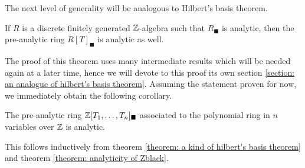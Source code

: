The next level of generality will be analogous to Hilbert's basis theorem.
\begin{theorem}
	\label{theorem: a kind of hilbert's basis theorem}
	
	If $R$ is a discrete finitely generated ${\mathbb{Z}}$-algebra such that $R_\blacksquare$ is analytic, then the pre-analytic ring $R[T]_\blacksquare$ is analytic as well.
\end{theorem}
The proof of this theorem uses many intermediate results which will be needed again at a later time, hence we will devote to this proof its own section \ref{section: an analogue of hilbert's basis theorem}. Assuming the statement proven for now, we immediately obtain the following corollary.
\begin{corollary}
	\label{corollary: analyticity of Ablack for finitely generated free Z-algebras}
	
	The pre-analytic ring ${\mathbb{Z}}[T_1,\dots, T_n]_\blacksquare$ associated to the polynomial ring in $n$ variables over ${\mathbb{Z}}$ is analytic.
\end{corollary}
\begin{shortproof}
	This follows inductively from theorem \ref{theorem: a kind of hilbert's basis theorem} and theorem \ref{theorem: analyticity of Zblack}.
\end{shortproof}

